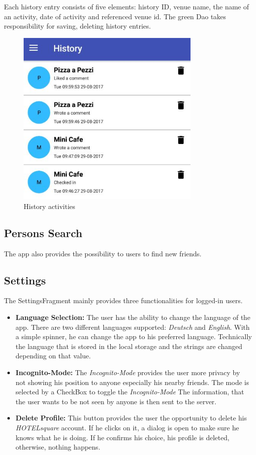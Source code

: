 Each history entry consists of five elements: history ID, venue name, the name of an activity, date of activity and referenced venue id. The green Dao takes responsibility for saving, deleting history entries.
\begin{figure}[htbp]
	\includegraphics[width=0.8\textwidth]{images/history.jpg}
	\centering
	\caption{History activities}\label{fig:history}
\end{figure}

\subsection{Persons Search}
The app also provides the possibility to users to find new friends. 
\subsection{Settings}
The SettingsFragment mainly provides three functionalities for logged-in users.

\begin{itemize}
\item \textbf{Language Selection:} The user has the ability to change the language of the app. There are two different languages supported: \textit{Deutsch} and \textit{English}. With a simple spinner, he can change the app to his preferred language. Technically the language that is stored in the local storage and the strings are changed depending on that value.
\item \textbf{Incognito-Mode:} The \textit{Incognito-Mode} provides the user more privacy by not showing his position to anyone especially his nearby friends. The mode is selected by a CheckBox to toggle the \textit{Incognito-Mode} The information, that the user wants to be not seen by anyone is then sent to the server.
\item \textbf{Delete Profile:} This button provides the user the opportunity to delete his \textit{HOTELsquare} account. If he clicks on it, a dialog is open to make sure he knows what he is doing. If he confirms his choice, his profile is deleted, otherwise, nothing happens.
\end{itemize}

